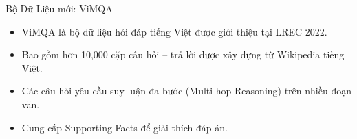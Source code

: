 \documentclass{beamer}
\begin{document}



\begin{frame}{Bộ Dữ Liệu mới: ViMQA}

\begin{itemize}
    \item ViMQA là bộ dữ liệu hỏi đáp tiếng Việt được giới thiệu tại LREC 2022.
    
    \item Bao gồm hơn 10,000 cặp câu hỏi -- trả lời được xây dựng từ Wikipedia tiếng Việt.

    \item Các câu hỏi yêu cầu suy luận đa bước (Multi-hop Reasoning) trên nhiều đoạn văn.

    \item Cung cấp Supporting Facts để giải thích đáp án.

\end{itemize}

\end{frame}

\end{document}
